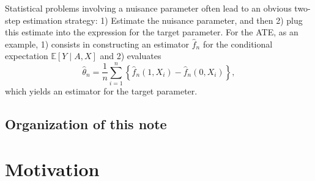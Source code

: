 \documentclass[a4,danish]{article}
\newcommand{\EE}{\mathbb{E}}
\begin{document}

Statistical problems involving a nuisance parameter often lead to an
obvious two-step estimation strategy: 1) Estimate the nuisance
parameter, and then 2) plug this estimate into the expression for the
target parameter. For the ATE, as an example, 1) consists in
constructing an estimator $\hat{f}_n$ for the conditional expectation
$\EE[Y \mid A, X]$ and 2) evaluates
\begin{equation*}
  \hat{\theta}_n = \frac{1}{n} \sum_{i=1}^{n}
  \left\{
    \hat{f}_n(1, X_i) - \hat{f}_n(0, X_i)
  \right\},
\end{equation*}
which yields an estimator for the target parameter.

\subsection{Organization of this note}
\label{sec:organization}


\section{Motivation}
\label{sec:motivation}
\end{document}
